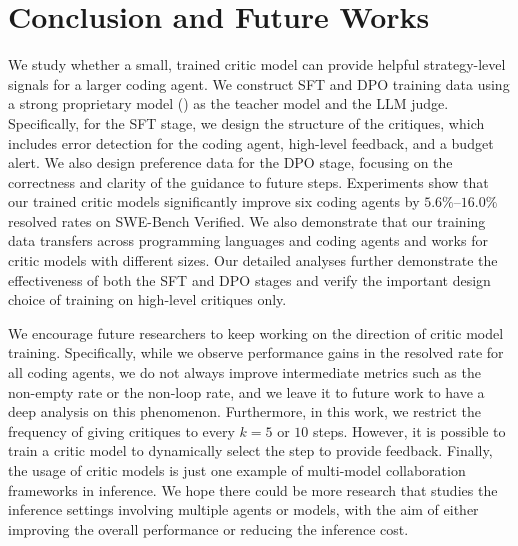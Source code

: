 \section{Conclusion and Future Works}
\label{critic:sec:conclusion}

We study whether a small, trained critic model can provide helpful strategy-level signals for a larger coding agent. 
We construct SFT and DPO training data using a strong proprietary model (\criticopus{}) as the teacher model and the LLM judge.
Specifically, for the SFT stage, we design the structure of the critiques, which includes error detection for the coding agent, high-level feedback, and a budget alert.
We also design preference data for the DPO stage, focusing on the correctness and clarity of the guidance to future steps.
Experiments show that our trained critic models significantly improve six coding agents by $5.6\%$--$16.0\%$ resolved rates on SWE-Bench Verified.
We also demonstrate that our training data transfers across programming languages and coding agents and works for critic models with different sizes.
Our detailed analyses further demonstrate the effectiveness of both the SFT and DPO stages and verify the important design choice of training on high-level critiques only. 

We encourage future researchers to keep working on the direction of critic model training.
Specifically, while we observe performance gains in the resolved rate for all coding agents, we do not always improve intermediate metrics such as the non-empty rate or the non-loop rate, and we leave it to future work to have a deep analysis on this phenomenon.
Furthermore, in this work, we restrict the frequency of giving critiques to every $k=5$ or $10$ steps. However, it is possible to train a critic model to dynamically select the step to provide feedback.
Finally, the usage of critic models is just one example of multi-model collaboration frameworks in inference.
We hope there could be more research that studies the inference settings involving multiple agents or models, with the aim of either improving the overall performance or reducing the inference cost.
